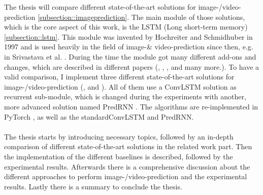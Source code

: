 The thesis will compare different state-of-the-art solutions for image-/video-prediction \ref{subsection::imageprediction}.
The main module of those solutions, which is the core aspect of this work, is the LSTM (Long short-term memory) \ref{subsection::lstm}.
This module was invented by Hochreiter and Schmidhuber  \cite{Hochreiter1997} in 1997 and is used heavily in the field of image-\& video-prediction since then, e.g. in Srivastava et al. 
\cite{Srivastava2015}.
During the time the module got many different add-ons and changes, which are described in different papers (\cite{Patraucean2015}, \cite{Lotter2016}, \cite{Wang2017}, \cite{Wang2018} and many 
more.). To have a valid comparison, I implement three different state-of-the-art solutions for image-/video-prediction (\cite{Shi2015}, \cite{Patraucean2015} and \cite{Lotter2016}).
All of them use a ConvLSTM solution as recurrent sub-module, which is changed during the experiments
with another, more advanced solution named PredRNN \cite{Wang2017}. The algorithms are re-implemented in PyTorch \cite{Paszke2019}, as well as the \glqq standard\grqq ConvLSTM and PredRNN.\\\\
The thesis starts by introducing necessary topics, followed by an in-depth comparison of different state-of-the-art solutions in the related work part. Then the implementation of the different baselines is described, followed by the experimental results. Afterwards there is a comprehensive discussion about the different
approaches to perform image-/video-prediction and the experimental results. Lastly there is a summary to conclude the thesis.